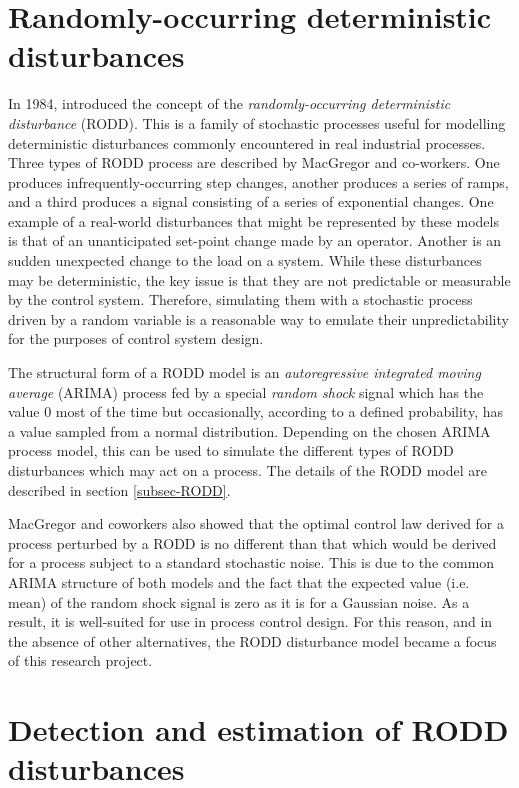 \section*{Randomly-occurring deterministic disturbances} \label{RODDs}

In 1984, \cite{macgregor_duality_1984} introduced the concept of the \textit{randomly-occurring deterministic disturbance} (RODD). This is a family of stochastic processes useful for modelling deterministic disturbances commonly encountered in real industrial processes. Three types of RODD process are described by MacGregor and co-workers. One produces infrequently-occurring step changes, another produces a series of ramps, and a third produces a signal consisting of a series of exponential changes. One example of a real-world disturbances that might be represented by these models is that of an unanticipated set-point change made by an operator. Another is an sudden unexpected change to the load on a system. While these disturbances may be deterministic, the key issue is that they are not predictable or measurable by the control system. Therefore, simulating them with a stochastic process driven by a random variable is a reasonable way to emulate their unpredictability for the purposes of control system design.

The structural form of a RODD model is an \textit{autoregressive integrated moving average} (ARIMA) process fed by a special \textit{random shock} signal which has the value 0 most of the time but occasionally, according to a defined probability, has a value sampled from a normal distribution. Depending on the chosen ARIMA process model, this can be used to simulate the different types of RODD disturbances which may act on a process. The details of the RODD model are described in section \ref{subsec-RODD}.

MacGregor and coworkers also showed that the optimal control law derived for a process perturbed by a RODD is no different than that which would be derived for a process subject to a standard stochastic noise.  This is due to the common ARIMA structure of both models and the fact that the expected value (i.e. mean) of the random shock signal is zero as it is for a Gaussian noise. As a result, it is well-suited for use in process control design. For this reason, and in the absence of other alternatives, the RODD disturbance model became a focus of this research project.

\section*{Detection and estimation of RODD disturbances}\label{detection_RODDs}

